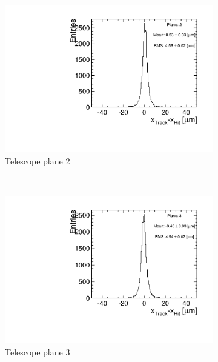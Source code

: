 \begin{figure}[htbp]
\begin{subfigure}[b]{0.3\textwidth}
    \includegraphics[width=\textwidth]{figures/Telescope/biasedResiduals/BiasedResiduals_run49_PlaneXRMS2.pdf}
    \caption{Telescope plane 2}
  \end{subfigure} \\
  \begin{subfigure}[b]{0.3\textwidth}
    \includegraphics[width=\textwidth]{figures/Telescope/biasedResiduals/BiasedResiduals_run49_PlaneXRMS3.pdf}
    \caption{Telescope plane 3}
  \end{subfigure}\hfill
  \begin{subfigure}[b]{0.3\textwidth}

\end{subfigure}
\end{figure}
